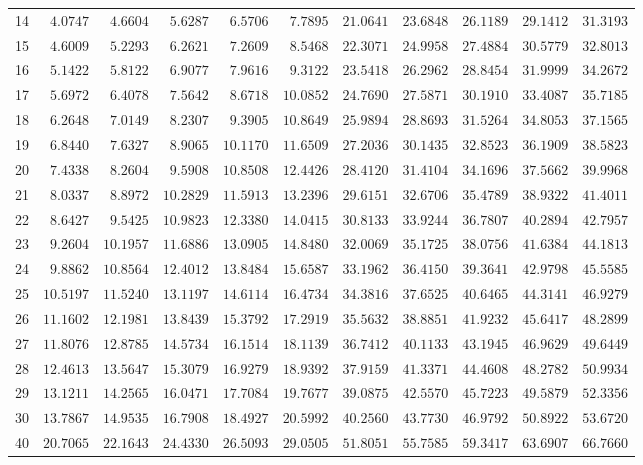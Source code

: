 \begin{center}
\begin{tabular}{l|rrrrrrrrrr}
14&$ 4.0747$&$ 4.6604$&$ 5.6287$&$ 6.5706$&$ 7.7895$&$ 21.0641$&$ 23.6848$&$ 26.1189$&$ 29.1412$&$ 31.3193$\\
15&$ 4.6009$&$ 5.2293$&$ 6.2621$&$ 7.2609$&$ 8.5468$&$ 22.3071$&$ 24.9958$&$ 27.4884$&$ 30.5779$&$ 32.8013$\\
16&$ 5.1422$&$ 5.8122$&$ 6.9077$&$ 7.9616$&$ 9.3122$&$ 23.5418$&$ 26.2962$&$ 28.8454$&$ 31.9999$&$ 34.2672$\\
17&$ 5.6972$&$ 6.4078$&$ 7.5642$&$ 8.6718$&$10.0852$&$ 24.7690$&$ 27.5871$&$ 30.1910$&$ 33.4087$&$ 35.7185$\\
18&$ 6.2648$&$ 7.0149$&$ 8.2307$&$ 9.3905$&$10.8649$&$ 25.9894$&$ 28.8693$&$ 31.5264$&$ 34.8053$&$ 37.1565$\\
19&$ 6.8440$&$ 7.6327$&$ 8.9065$&$10.1170$&$11.6509$&$ 27.2036$&$ 30.1435$&$ 32.8523$&$ 36.1909$&$ 38.5823$\\
20&$ 7.4338$&$ 8.2604$&$ 9.5908$&$10.8508$&$12.4426$&$ 28.4120$&$ 31.4104$&$ 34.1696$&$ 37.5662$&$ 39.9968$\\
21&$ 8.0337$&$ 8.8972$&$10.2829$&$11.5913$&$13.2396$&$ 29.6151$&$ 32.6706$&$ 35.4789$&$ 38.9322$&$ 41.4011$\\
22&$ 8.6427$&$ 9.5425$&$10.9823$&$12.3380$&$14.0415$&$ 30.8133$&$ 33.9244$&$ 36.7807$&$ 40.2894$&$ 42.7957$\\
23&$ 9.2604$&$10.1957$&$11.6886$&$13.0905$&$14.8480$&$ 32.0069$&$ 35.1725$&$ 38.0756$&$ 41.6384$&$ 44.1813$\\
24&$ 9.8862$&$10.8564$&$12.4012$&$13.8484$&$15.6587$&$ 33.1962$&$ 36.4150$&$ 39.3641$&$ 42.9798$&$ 45.5585$\\
25&$10.5197$&$11.5240$&$13.1197$&$14.6114$&$16.4734$&$ 34.3816$&$ 37.6525$&$ 40.6465$&$ 44.3141$&$ 46.9279$\\
26&$11.1602$&$12.1981$&$13.8439$&$15.3792$&$17.2919$&$ 35.5632$&$ 38.8851$&$ 41.9232$&$ 45.6417$&$ 48.2899$\\
27&$11.8076$&$12.8785$&$14.5734$&$16.1514$&$18.1139$&$ 36.7412$&$ 40.1133$&$ 43.1945$&$ 46.9629$&$ 49.6449$\\
28&$12.4613$&$13.5647$&$15.3079$&$16.9279$&$18.9392$&$ 37.9159$&$ 41.3371$&$ 44.4608$&$ 48.2782$&$ 50.9934$\\
29&$13.1211$&$14.2565$&$16.0471$&$17.7084$&$19.7677$&$ 39.0875$&$ 42.5570$&$ 45.7223$&$ 49.5879$&$ 52.3356$\\
30&$13.7867$&$14.9535$&$16.7908$&$18.4927$&$20.5992$&$ 40.2560$&$ 43.7730$&$ 46.9792$&$ 50.8922$&$ 53.6720$\\
40&$20.7065$&$22.1643$&$24.4330$&$26.5093$&$29.0505$&$ 51.8051$&$ 55.7585$&$ 59.3417$&$ 63.6907$&$ 66.7660$\\

\end{tabular}
\end{center}
